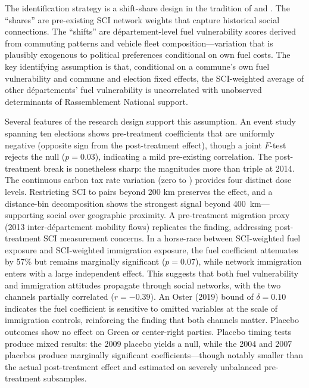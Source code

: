 \documentclass[12pt]{article}
\providecommand{\euro}{\texteuro}
\newcommand{\rn}{Rassemblement National}
\newcommand{\dept}{d\'{e}partement}
\newcommand{\depts}{d\'{e}partements}
\begin{document}
The identification strategy is a shift-share design in the tradition of \citet{goldsmith2020bartik} and \citet{borusyak2022quasi}. The ``shares'' are pre-existing SCI network weights that capture historical social connections. The ``shifts'' are \dept{}-level fuel vulnerability scores derived from commuting patterns and vehicle fleet composition---variation that is plausibly exogenous to political preferences conditional on own fuel costs. The key identifying assumption is that, conditional on a commune's own fuel vulnerability and commune and election fixed effects, the SCI-weighted average of other \depts{}' fuel vulnerability is uncorrelated with unobserved determinants of \rn{} support.

Several features of the research design support this assumption. An event study spanning ten elections shows pre-treatment coefficients that are uniformly negative (opposite sign from the post-treatment effect), though a joint $F$-test rejects the null ($p = 0.03$), indicating a mild pre-existing correlation. The post-treatment break is nonetheless sharp: the magnitudes more than triple at 2014. The continuous carbon tax rate variation (zero to \euro 44.60) provides four distinct dose levels. Restricting SCI to pairs beyond 200 km preserves the effect, and a distance-bin decomposition shows the strongest signal beyond 400~km---supporting social over geographic proximity. A pre-treatment migration proxy (2013 inter-\dept{} mobility flows) replicates the finding, addressing post-treatment SCI measurement concerns. In a horse-race between SCI-weighted fuel exposure and SCI-weighted immigration exposure, the fuel coefficient attenuates by 57\% but remains marginally significant ($p = 0.07$), while network immigration enters with a large independent effect. This suggests that both fuel vulnerability and immigration attitudes propagate through social networks, with the two channels partially correlated ($r = -0.39$). An Oster (2019) bound of $\delta = 0.10$ indicates the fuel coefficient is sensitive to omitted variables at the scale of immigration controls, reinforcing the finding that both channels matter. Placebo outcomes show no effect on Green or center-right parties. Placebo timing tests produce mixed results: the 2009 placebo yields a null, while the 2004 and 2007 placebos produce marginally significant coefficients---though notably smaller than the actual post-treatment effect and estimated on severely unbalanced pre-treatment subsamples.
\end{document}
